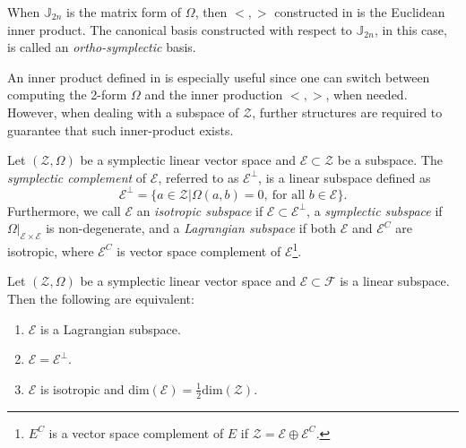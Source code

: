 \begin{corollary} \label{theorem:2.12}
When $\mathbb J_{2n}$ is the matrix form of $\Omega$, then $<,>$ constructed in  is the Euclidean inner product. The canonical basis constructed with respect to $\mathbb J_{2n}$, in this case, is called an \emph{ortho-symplectic} basis.
\end{corollary}

An inner product defined in  is especially useful since one can switch between computing the 2-form $\Omega$ and the inner production $<,>$, when needed. However, when dealing with a subspace of $\mathcal Z$, further structures are required to guarantee that such inner-product exists.

\begin{definition} \cite{abraham1978foundations}
Let $(\mathcal Z, \Omega)$ be a symplectic linear vector space and $\mathcal E \subset \mathcal Z$ be a subspace. The \emph{symplectic complement} of $\mathcal E$, referred to as $\mathcal E^{\perp}$, is a linear subspace defined as
\begin{equation*}
	\mathcal E^{\perp} = \{ a \in \mathcal Z | \Omega(a,b) = 0, \ \text{for all } b \in \mathcal E \}.
\end{equation*}
Furthermore, we call $\mathcal E$ an \emph{isotropic subspace} if $\mathcal E\subset \mathcal E^{\perp}$, a \emph{symplectic subspace} if $\Omega|_{\mathcal E\times \mathcal E}$ is non-degenerate, and a \emph{Lagrangian subspace} if both $\mathcal E$ and $\mathcal E^C$ are isotropic, where $\mathcal E^C$ is vector space complement of $\mathcal E$\footnote{$E^{C}$ is a vector space complement of $E$ if $\mathcal{Z} = \mathcal E\oplus \mathcal E^C$. }.
\end{definition}
\begin{proposition} \label{theorem:2.13} \cite{abraham1978foundations}
Let $(\mathcal Z, \Omega)$ be a symplectic linear vector space and $\mathcal E\subset \mathcal F$ is a linear subspace. Then the following are equivalent:
\begin{enumerate} [label=(\alph*)]
\item $\mathcal E$ is a Lagrangian subspace.
\item $\mathcal E = \mathcal E^{\perp}$.
\item $\mathcal E$ is isotropic and dim$(\mathcal E) = \frac 1 2 \text{dim}(\mathcal Z)$.
\end{enumerate}
\end{proposition}
